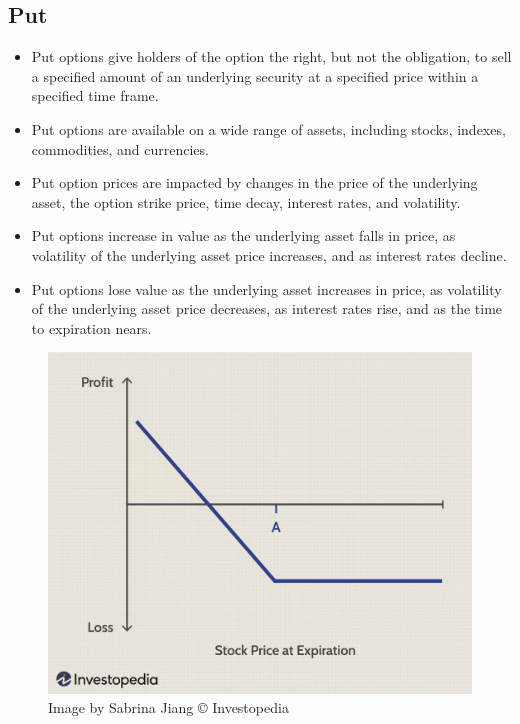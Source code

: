 \begin{multicols}{2}
\hypertarget{put}{%
\subsection{Put}\label{put}}

\begin{itemize}
\tightlist
\item
  Put options give holders of the option the right, but not the
  obligation, to sell a specified amount of an underlying security at a
  specified price within a specified time frame.
\item
  Put options are available on a wide range of assets, including stocks,
  indexes, commodities, and currencies.
\item
  Put option prices are impacted by changes in the price of the
  underlying asset, the option strike price, time decay, interest rates,
  and volatility.
\item
  Put options increase in value as the underlying asset falls in price,
  as volatility of the underlying asset price increases, and as interest
  rates decline.
\item
  Put options lose value as the underlying asset increases in price, as
  volatility of the underlying asset price decreases, as interest rates
  rise, and as the time to expiration nears.
\end{itemize}

\begin{figure}
\centering
\includegraphics{put.png}
\caption{Image by Sabrina Jiang © Investopedia}
\end{figure}


\end{multicols}
